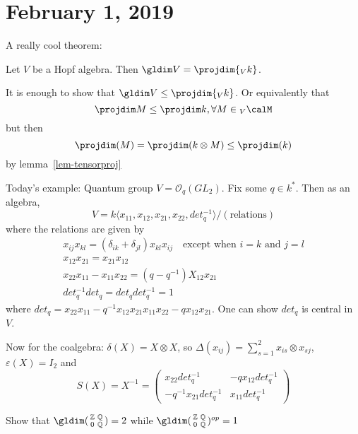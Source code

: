 \documentclass[12pt]{article}
\newcommand*{\Z}{
\mathbb{Z}
}
\newcommand*{\Q}{
\mathbb{Q}
}
\begin{document}
\section{February 1, 2019}
A really cool theorem:
\begin{thm}
	Let $V$ be a Hopf algebra. Then $\gldim V=\projdim {_Vk}$.
\end{thm}
\begin{prf}
	It is enough to show that $\gldim V\le\projdim{_Vk}$. Or equivalently that
	\[\projdim M\le \projdim k,\forall M\in{_V\calM}\]
	but then
	\[\projdim(M)=\projdim(k\otimes M)\le \projdim(k)\]
	by lemma~\ref{lem-tensorproj}
\end{prf}
\begin{ex}
	Today's example: Quantum group $V=\mathcal{O}_q(GL_2)$. Fix some $q\in k^*$. Then as an algebra, 
	\[V=k\langle x_{11},x_{12},x_{21},x_{22},det_q^{-1}\rangle/(\text{relations})\]
	where the relations are given by 
	\begin{align*}
		x_{ij}x_{kl}=(\delta_{ik}+\delta_{jl})x_{kl}x_{ij}\quad\text{except when } i=k \text{ and } j=l\\
		x_{12}x_{21}=x_{21}x_{12}\\
		x_{22}x_{11}-x_{11}x_{22}=(q-q^{-1})X_{12}x_{21}\\
		det_q^{-1}det_q=det_q det_q^{-1}=1
	\end{align*}
	where $det_q=x_{22}x_{11}-q^{-1}x_{12}x_{21}x_{11}x_{22}-qx_{12}x_{21}$. One can show $det_q$ is central in $V$.

	Now for the coalgebra: $\delta(X)=X\otimes X$, so $\Delta(x_{ij})=\sum_{s=1}^2 x_{is}\otimes x_{sj}$, $\varepsilon(X)=I_2$ and
	\[S(X)=X^{-1}=\begin{pmatrix}
		x_{22}det_q^{-1} & -qx_{12}det_q^{-1}\\
		-q^{-1}x_{21}det_q^{-1} & x_{11}det_q^{-1}
	\end{pmatrix}\]
\end{ex}
\begin{prob}
	Show that $\gldim(\begin{smallmatrix}\Z & \Q\\0 & \Q\end{smallmatrix})=2$ while $\gldim(\begin{smallmatrix}\Z & \Q\\0 & \Q\end{smallmatrix})^{op}=1$
\end{prob}
\end{document}
